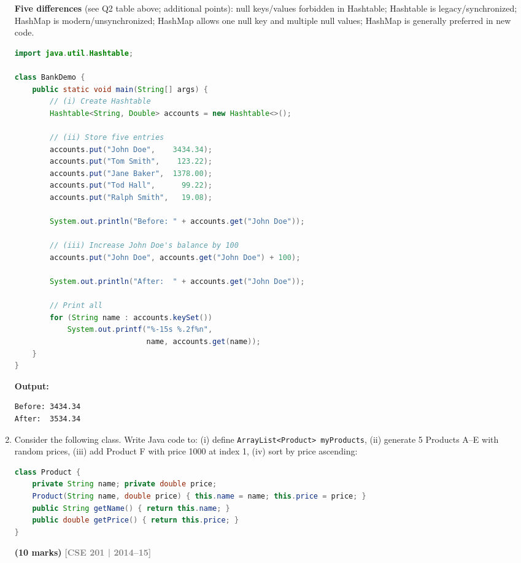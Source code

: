 \documentclass[12pt,a3paper]{article}
\newcommand{\yr}[1]{\hfill\textcolor{gray}{\small\textbf{[#1]}}}
\newcommand{\mk}[1]{\textcolor{orange!70!black}{\small\textbf{(#1 marks)}}}
\begin{document}
\begin{enumerate}
\begin{tcolorbox}[enhanced,breakable,ansbox,
  colback=cG!4,colframe=cG,boxrule=0.8pt,arc=5pt,
  title={\textbf{Answer --- Hashtable with Bank Accounts}},
  fonttitle=\bfseries\color{white},colbacktitle=cG]

\textbf{Five differences} (see Q2 table above; additional points):
null keys/values forbidden in Hashtable; Hashtable is legacy/synchronized;
HashMap is modern/unsynchronized; HashMap allows one null key and multiple
null values; HashMap is generally preferred in new code.

\begin{lstlisting}[language=Java]
import java.util.Hashtable;

class BankDemo {
    public static void main(String[] args) {
        // (i) Create Hashtable
        Hashtable<String, Double> accounts = new Hashtable<>();

        // (ii) Store five entries
        accounts.put("John Doe",    3434.34);
        accounts.put("Tom Smith",    123.22);
        accounts.put("Jane Baker",  1378.00);
        accounts.put("Tod Hall",      99.22);
        accounts.put("Ralph Smith",   19.08);

        System.out.println("Before: " + accounts.get("John Doe"));

        // (iii) Increase John Doe's balance by 100
        accounts.put("John Doe", accounts.get("John Doe") + 100);

        System.out.println("After:  " + accounts.get("John Doe"));

        // Print all
        for (String name : accounts.keySet())
            System.out.printf("%-15s %.2f%n",
                              name, accounts.get(name));
    }
}
\end{lstlisting}
\textbf{Output:}
\begin{verbatim}
Before: 3434.34
After:  3534.34
\end{verbatim}
\end{tcolorbox}



\item Consider the following class. Write Java code to: (i) define \texttt{ArrayList<Product> myProducts}, (ii) generate 5 Products A--E with random prices, (iii) add Product F with price 1000 at index 1, (iv) sort by price ascending:
\begin{lstlisting}[language=Java]
class Product {
    private String name; private double price;
    Product(String name, double price) { this.name = name; this.price = price; }
    public String getName() { return this.name; }
    public double getPrice() { return this.price; }
}
\end{lstlisting}
\mk{10}
\yr{CSE 201 | 2014--15}


\end{enumerate}
\end{document}
